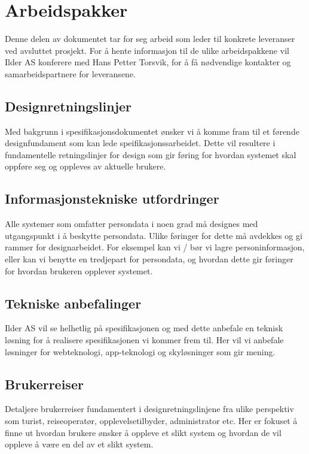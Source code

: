 \section{Arbeidspakker}

Denne delen av dokumentet tar for seg arbeid som leder til konkrete leveranser ved avsluttet prosjekt. For å hente informasjon til de ulike arbeidspakkene vil Ilder AS konferere med Hans Petter Torsvik, for å få nødvendige kontakter og samarbeidspartnere for leveransene.

\subsection{Designretningslinjer}
Med bakgrunn i spesifikasjonsdokumentet ønsker vi å komme fram til et førende designfundament som kan lede speifikasjonssarbeidet. Dette vil resultere i fundamentelle retningslinjer for design som gir føring for hvordan systemet skal oppføre seg og oppleves av aktuelle brukere. 

\subsection{Informasjonstekniske utfordringer}
Alle systemer som omfatter persondata i noen grad må designes med utgangspunkt i å beskytte persondata. Ulike føringer for dette må avdekkes og gi rammer for designarbeidet. For eksempel kan vi / bør vi lagre personinformasjon, eller kan vi benytte en tredjepart for persondata, og hvordan dette gir føringer for hvordan brukeren opplever systemet.

\subsection{Tekniske anbefalinger}
Ilder AS vil se helhetlig på spesifikasjonen og med dette anbefale en teknisk løsning for å realisere spesifikasjonen vi kommer frem til. Her vil vi anbefale løsninger for webteknologi, app-teknologi og skyløsninger som gir mening.

\subsection{Brukerreiser}
Detaljere brukerreiser fundamentert i designretningslinjene fra ulike perspektiv som turist, reiseoperatør, opplevelsetilbyder, administrator etc. Her er fokuset å finne ut hvordan brukere ønsker å oppleve et slikt system og hvordan de vil oppleve å være en del av et slikt system.

